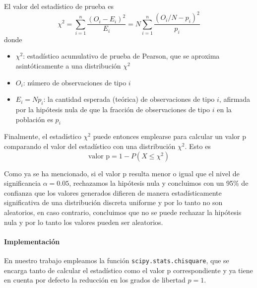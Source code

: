 El valor del estadístico de prueba es
\begin{equation}
\chi^{2} = \sum_{i=1}^{n}{\frac{(O_{i}-E_{i})^{2}}{E_{i}}} = N\sum_{i=1}^{n}{\frac{\left(O_{i}/N-p_{i}\right)^{2}}{p_{i}}}
\end{equation}
donde
\begin{itemize}
  \item $\chi^2$: estadístico acumulativo de prueba de Pearson, que se aproxima asintóticamente a una distribución $\chi^{2}$
  \item $O_{i}$: número de observaciones de tipo $i$
  \item $E_{i} = Np_{i}$: la cantidad esperada (teórica) de observaciones de tipo $i$, afirmada por la hipótesis nula de que la fracción de observaciones de tipo $i$ en la población es $p_{i}$
\end{itemize}

Finalmente, el estadístico $\chi^{2}$ puede entonces emplearse para calcular un valor p comparando el valor del estadístico con una distribución $\chi^{2}$. Esto es
\begin{equation}
  \text{valor p} = 1 - P(X \le \chi^2)
\end{equation}

Como ya se ha mencionado, si el valor p resulta menor o igual que el nivel de significancia $\alpha = 0.05$, rechazamos la hipótesis nula y concluimos con un 95\% de confianza que los valores generados difieren de manera estadísticamente significativa de una distribución discreta uniforme y por lo tanto no son aleatorios, en caso contrario, concluimos que no se puede rechazar la hipótesis nula y por lo tanto los valores pueden ser aleatorios.

\paragraph{Implementación}
En nuestro trabajo empleamos la función \texttt{scipy.stats.chisquare}, que se encarga tanto de calcular el estadístico como el valor p correspondiente y ya tiene en cuenta por defecto la reducción en los grados de libertad $p = 1$.

\nocite{enwiki2022pearson}
